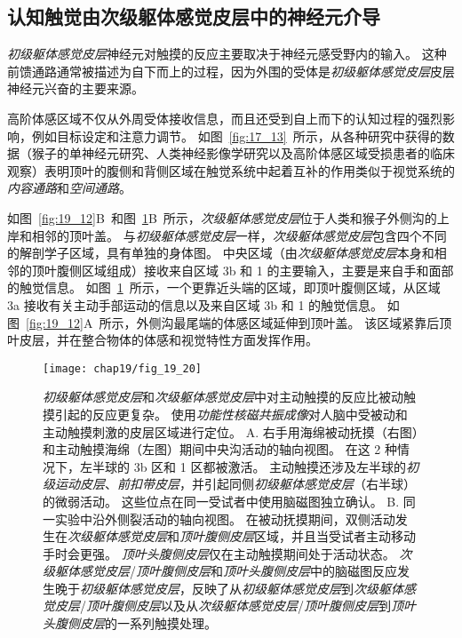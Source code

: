 \subsection{认知触觉由次级躯体感觉皮层中的神经元介导}

\textit{初级躯体感觉皮层}神经元对触摸的反应主要取决于神经元感受野内的输入。
这种前馈通路通常被描述为自下而上的过程，因为外围的受体是\textit{初级躯体感觉皮层}皮层神经元兴奋的主要来源。


高阶体感区域不仅从外周受体接收信息，而且还受到自上而下的认知过程的强烈影响，例如目标设定和注意力调节。
如图~\ref{fig:17_13}~所示，从各种研究中获得的数据（猴子的单神经元研究、人类神经影像学研究以及高阶体感区域受损患者的临床观察）表明顶叶的腹侧和背侧区域在触觉系统中起着互补的作用类似于视觉系统的\textit{内容通路}和\textit{空间通路}。


如图~\ref{fig:19_12}B~和图~\ref{fig:19_20}B~所示，\textit{次级躯体感觉皮层}位于人类和猴子外侧沟的上岸和相邻的顶叶盖。
与\textit{初级躯体感觉皮层}一样，\textit{次级躯体感觉皮层}包含四个不同的解剖学子区域，具有单独的身体图。
中央区域（由\textit{次级躯体感觉皮层}本身和相邻的顶叶腹侧区域组成）接收来自区域 3b 和 1 的主要输入，主要是来自手和面部的触觉信息。
如图~\ref{fig:19_20}~所示，一个更靠近头端的区域，即顶叶腹侧区域，从区域 3a 接收有关主动手部运动的信息以及来自区域 3b 和 1 的触觉信息。
如图~\ref{fig:19_12}A~所示，外侧沟最尾端的体感区域延伸到顶叶盖。
该区域紧靠后顶叶皮层，并在整合物体的体感和视觉特性方面发挥作用。


\begin{figure}[htbp]
	\centering
	\texttt{[image: chap19/fig\_19\_20]}
	\caption{\textit{初级躯体感觉皮层}和\textit{次级躯体感觉皮层}中对主动触摸的反应比被动触摸引起的反应更复杂。
		使用\textit{功能性核磁共振成像}对人脑中受被动和主动触摸刺激的皮层区域进行定位\cite{hinkley2007sensorimotor}。
		A. 右手用海绵被动抚摸（右图）和主动触摸海绵（左图）期间中央沟活动的轴向视图。
		在这 2 种情况下，左半球的 3b 区和 1 区都被激活。
		主动触摸还涉及左半球的\textit{初级运动皮层}、\textit{前扣带皮层}，并引起同侧\textit{初级躯体感觉皮层}（右半球）的微弱活动。
		这些位点在同一受试者中使用脑磁图独立确认。
		B. 同一实验中沿外侧裂活动的轴向视图。
		在被动抚摸期间，双侧活动发生在\textit{次级躯体感觉皮层}和\textit{顶叶腹侧皮层}区域，并且当受试者主动移动手时会更强。
		\textit{顶叶头腹侧皮层}仅在主动触摸期间处于活动状态。
		\textit{次级躯体感觉皮层}/\textit{顶叶腹侧皮层}和\textit{顶叶头腹侧皮层}中的脑磁图反应发生晚于\textit{初级躯体感觉皮层}，反映了从\textit{初级躯体感觉皮层}到\textit{次级躯体感觉皮层}/\textit{顶叶腹侧皮层}以及从\textit{次级躯体感觉皮层}/\textit{顶叶腹侧皮层}到\textit{顶叶头腹侧皮层}的一系列触摸处理。}
	\label{fig:19_20}
\end{figure}



